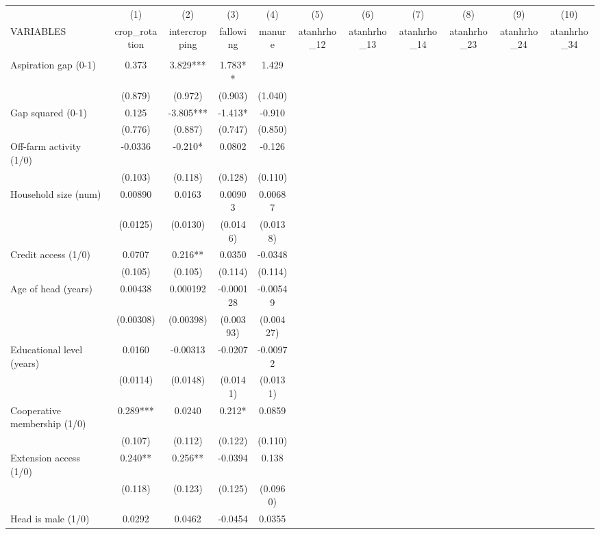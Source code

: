 \documentclass[]{article}
\begin{document}
\begin{tabular}{lcccccccccc} \hline
 & (1) & (2) & (3) & (4) & (5) & (6) & (7) & (8) & (9) & (10) \\
VARIABLES & crop\_rotation & intercropping & fallowing & manure & atanhrho\_12 & atanhrho\_13 & atanhrho\_14 & atanhrho\_23 & atanhrho\_24 & atanhrho\_34 \\ \hline
 &  &  &  &  &  &  &  &  &  &  \\
Aspiration gap (0-1) & 0.373 & 3.829*** & 1.783** & 1.429 &  &  &  &  &  &  \\
 & (0.879) & (0.972) & (0.903) & (1.040) &  &  &  &  &  &  \\
Gap squared (0-1) & 0.125 & -3.805*** & -1.413* & -0.910 &  &  &  &  &  &  \\
 & (0.776) & (0.887) & (0.747) & (0.850) &  &  &  &  &  &  \\
Off-farm activity (1/0) & -0.0336 & -0.210* & 0.0802 & -0.126 &  &  &  &  &  &  \\
 & (0.103) & (0.118) & (0.128) & (0.110) &  &  &  &  &  &  \\
Household size (num) & 0.00890 & 0.0163 & 0.00903 & 0.00687 &  &  &  &  &  &  \\
 & (0.0125) & (0.0130) & (0.0146) & (0.0138) &  &  &  &  &  &  \\
Credit access (1/0) & 0.0707 & 0.216** & 0.0350 & -0.0348 &  &  &  &  &  &  \\
 & (0.105) & (0.105) & (0.114) & (0.114) &  &  &  &  &  &  \\
Age of head (years) & 0.00438 & 0.000192 & -0.000128 & -0.00549 &  &  &  &  &  &  \\
 & (0.00308) & (0.00398) & (0.00393) & (0.00427) &  &  &  &  &  &  \\
Educational level (years) & 0.0160 & -0.00313 & -0.0207 & -0.00972 &  &  &  &  &  &  \\
 & (0.0114) & (0.0148) & (0.0141) & (0.0131) &  &  &  &  &  &  \\
Cooperative membership (1/0) & 0.289*** & 0.0240 & 0.212* & 0.0859 &  &  &  &  &  &  \\
 & (0.107) & (0.112) & (0.122) & (0.110) &  &  &  &  &  &  \\
Extension access (1/0) & 0.240** & 0.256** & -0.0394 & 0.138 &  &  &  &  &  &  \\
 & (0.118) & (0.123) & (0.125) & (0.0960) &  &  &  &  &  &  \\
Head is male (1/0) & 0.0292 & 0.0462 & -0.0454 & 0.0355 &  &  &  &  &  &  \\

\end{tabular}
\end{document}
